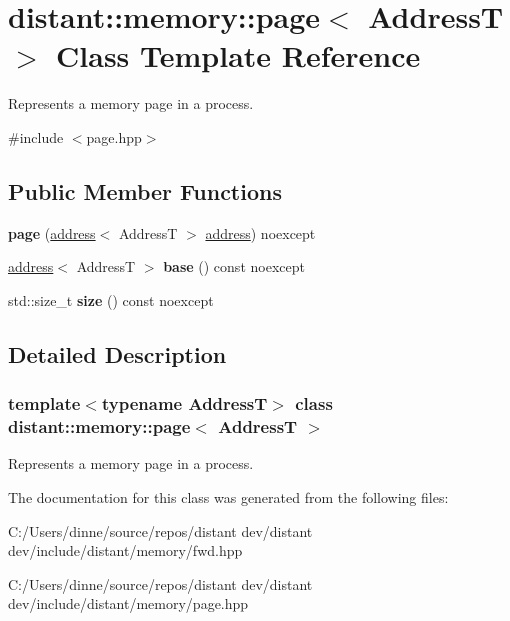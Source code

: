 \hypertarget{classdistant_1_1memory_1_1page}{}\section{distant\+:\+:memory\+:\+:page$<$ AddressT $>$ Class Template Reference}
\label{classdistant_1_1memory_1_1page}


Represents a memory page in a process.  




{\ttfamily \#include $<$page.\+hpp$>$}

\subsection*{Public Member Functions}
\begin{DoxyCompactItemize}
\item 
\mbox{\label{classdistant_1_1memory_1_1page_a93408ce89efd9cc5bc943e92ca655a88}} 
{\bfseries page} (\mbox{\hyperlink{classdistant_1_1memory_1_1address}{address}}$<$ AddressT $>$ \mbox{\hyperlink{classdistant_1_1memory_1_1address}{address}}) noexcept
\item 
\mbox{\label{classdistant_1_1memory_1_1page_a60a5a745def4163cf6bf3fe867a059a0}} 
\mbox{\hyperlink{classdistant_1_1memory_1_1address}{address}}$<$ AddressT $>$ {\bfseries base} () const noexcept
\item 
\mbox{\label{classdistant_1_1memory_1_1page_acd0ed852fb84036893b81c0165f3d772}} 
std\+::size\+\_\+t {\bfseries size} () const noexcept
\end{DoxyCompactItemize}


\subsection{Detailed Description}
\subsubsection*{template$<$typename AddressT$>$\newline
class distant\+::memory\+::page$<$ Address\+T $>$}

Represents a memory page in a process. 

The documentation for this class was generated from the following files\+:\begin{DoxyCompactItemize}
\item 
C\+:/\+Users/dinne/source/repos/distant dev/distant dev/include/distant/memory/fwd.\+hpp\item 
C\+:/\+Users/dinne/source/repos/distant dev/distant dev/include/distant/memory/page.\+hpp\end{DoxyCompactItemize}
